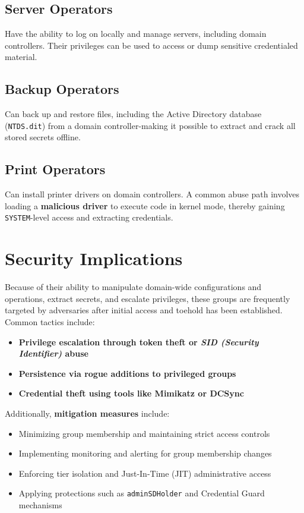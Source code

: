 \subsection{Server Operators}
Have the ability to log on locally and manage servers, including domain controllers. Their privileges can be used to access or dump sensitive credentialed material.

\subsection{Backup Operators}
Can back up and restore files, including the Active Directory database (\texttt{NTDS.dit}) from a domain controller-making it possible to extract and crack all stored secrets offline.

\subsection{Print Operators}
Can install printer drivers on domain controllers. A common abuse path involves loading a \textbf{malicious driver} to execute code in kernel mode, thereby gaining \texttt{SYSTEM}-level access and extracting credentials.

\section{Security Implications}
Because of their ability to manipulate domain-wide configurations and operations, extract secrets, and escalate privileges, these groups are frequently targeted by adversaries after initial access and toehold has been established. Common tactics include:
\begin{itemize}
    \item \textbf{Privilege escalation through token theft or \textit{SID (Security Identifier)} abuse}
    \item \textbf{Persistence via rogue additions to privileged groups}
    \item \textbf{Credential theft using tools like Mimikatz or DCSync}
\end{itemize}

    Additionally, \textbf{mitigation measures} include:
    \begin{itemize}
        \item Minimizing group membership and maintaining strict access controls
        \item Implementing monitoring and alerting for group membership changes
        \item Enforcing tier isolation and Just-In-Time (JIT) administrative access
        \item Applying protections such as \texttt{adminSDHolder} and Credential Guard mechanisms
    \end{itemize}

